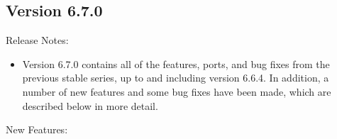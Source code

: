 \subsection*{\label{sec:New-6-7-0}Version 6.7.0}

\noindent Release Notes:

\begin{itemize}

\item Version 6.7.0 contains all of the features, ports, and bug fixes
  from the previous stable series, up to and including version 6.6.4.
  In addition, a number of new features and some bug fixes have been
  made, which are described below in more detail.

\end{itemize}


\noindent New Features:

